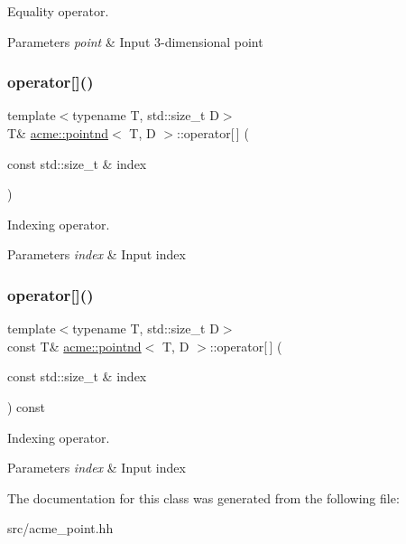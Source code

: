 Equality operator. 


\begin{DoxyParams}{Parameters}
{\em point} & Input 3-\/dimensional point \\
\hline
\end{DoxyParams}
\mbox{\label{classacme_1_1pointnd_a35b0691673728d98d455c007612d6b91}} 
\subsubsection{\texorpdfstring{operator[]()}{operator[]()}\hspace{0.1cm}{\footnotesize\ttfamily [1/2]}}
{\footnotesize\ttfamily template$<$typename T, std\+::size\+\_\+t D$>$ \\
T\& \hyperlink{classacme_1_1pointnd}{acme\+::pointnd}$<$ T, D $>$\+::operator\mbox{[}$\,$\mbox{]} (\begin{DoxyParamCaption}\item[{const std\+::size\+\_\+t \&}]{index }\end{DoxyParamCaption})\hspace{0.3cm}{\ttfamily [inline]}}



Indexing operator. 


\begin{DoxyParams}{Parameters}
{\em index} & Input index \\
\hline
\end{DoxyParams}
\mbox{\label{classacme_1_1pointnd_a565e9ed195c8f8dadc570a029a3deb94}} 
\subsubsection{\texorpdfstring{operator[]()}{operator[]()}\hspace{0.1cm}{\footnotesize\ttfamily [2/2]}}
{\footnotesize\ttfamily template$<$typename T, std\+::size\+\_\+t D$>$ \\
const T\& \hyperlink{classacme_1_1pointnd}{acme\+::pointnd}$<$ T, D $>$\+::operator\mbox{[}$\,$\mbox{]} (\begin{DoxyParamCaption}\item[{const std\+::size\+\_\+t \&}]{index }\end{DoxyParamCaption}) const\hspace{0.3cm}{\ttfamily [inline]}}



Indexing operator. 


\begin{DoxyParams}{Parameters}
{\em index} & Input index \\
\hline
\end{DoxyParams}


The documentation for this class was generated from the following file\+:\begin{DoxyCompactItemize}
\item 
src/acme\+\_\+point.\+hh\end{DoxyCompactItemize}
